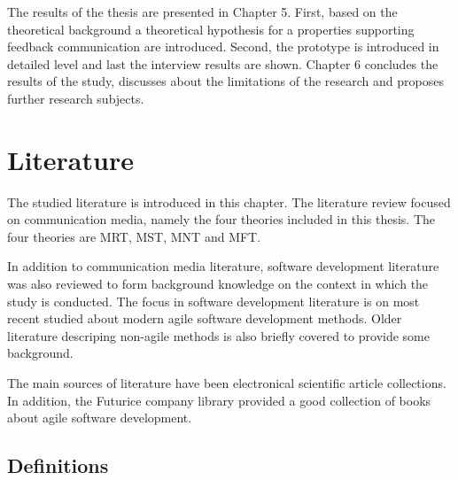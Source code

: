 \documentclass[english,12pt,a4paper,pdftex]{article}
\begin{document}
The results of the thesis are presented in Chapter 5. First, based on the theoretical background a theoretical hypothesis for a properties supporting feedback communication are introduced. Second, the prototype is introduced in detailed level and last the interview results are shown. Chapter 6 concludes the results of the study, discusses about the limitations of the research and proposes further research subjects.

\thispagestyle{empty}


\clearpage

\section{Literature}
\acresetall

The studied literature is introduced in this chapter. The literature review focused on communication media, namely the four theories included in this thesis. The four theories are \ac{MRT}, \ac{MST}, \ac{MNT} and \ac{MFT}.

In addition to communication media literature, software development literature was also reviewed to form background knowledge on the context in which the study is conducted. The focus in software development literature is on most recent studied about modern agile software development methods. Older literature descriping non-agile methods is also briefly covered to provide some background.

The main sources of literature have been electronical scientific article collections. In addition, the Futurice company library provided a good collection of books about agile software development.

\subsection{Definitions}
\end{document}
